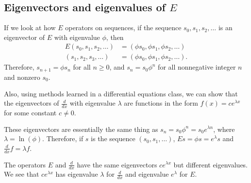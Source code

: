 \documentclass[11pt]{article}
\begin{document}
\subsection{Eigenvectors and eigenvalues of $E$}
If we look at how $E$ operators on sequences, if the sequence $s_{0},s_{1},s_{2},\ldots$ is an eigenvector of $E$ with eigenvalue $\phi$, then
\begin{align*}
E(s_{0},s_{1},s_{2},\ldots)&=(\phi s_{0},\phi s_{1},\phi s_{2},\ldots)\\
(s_{1},s_{2},s_{3},\ldots)&=(\phi s_{0},\phi s_{1},\phi s_{2},\ldots).
\end{align*}
Therefore, $s_{n+1}=\phi s_{n}$ for all $n\geq 0$, and $s_{n}=s_{0}\phi^{n}$ for all nonnegative integer $n$ and nonzero $s_{0}$. 

Also, using methods learned in a differential equations class, we can show that the eigenvectors of $\frac{d}{dx}$ with eigenvalue $\lambda$ are functions in the form $f(x)=ce^{\lambda x}$ for some constant $c\neq 0$. 

These eigenvectors are essentially the same thing as $s_{n}=s_{0}\phi^{n}=s_{0}e^{\lambda n}$, where $\lambda=\ln(\phi)$. Therefore, if $s$ is the sequence $(s_{0},s_{1},\ldots)$, $Es=\phi s=e^{\lambda}s$ and $\frac{d}{dx}f=\lambda f$. 

The operators $E$ and $\frac{d}{dx}$ have the same eigenvectors $ce^{\lambda x}$ but different eigenvalues. We see that $ce^{\lambda x}$ has eigenvalue $\lambda$ for $\frac{d}{dx}$ and eigenvalue $e^{\lambda}$ for $E$.
\end{document}
